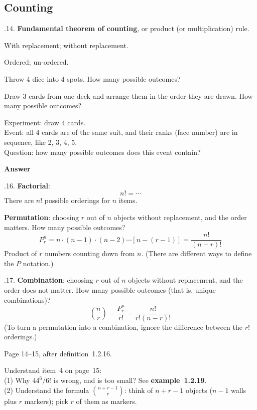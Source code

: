\documentclass[12pt]{article}
\begin{document}
\subsection{Counting}

.14. \textbf{Fundamental theorem of counting},
or product (or multiplication) rule.

With replacement; without replacement.

Ordered; un-ordered.

\example
Throw 4 dice into 4 spots.
How many possible outcomes?

\example
Draw 3 cards from one deck and arrange them in the order they are drawn.
How many possible outcomes?

\example
Experiment: draw 4 cards.\\
Event: all 4 cards are of the same suit, and their ranks (face
number) are in sequence, like 2, 3, 4, 5.\\
Question: how many possible outcomes does this event contain?

\textbf{Answer}


.16. \textbf{Factorial}:
\[
n! = \cdots
\]
There are $n!$ possible orderings for $n$ items.

 \textbf{Permutation}:
choosing $r$ out of $n$ objects without replacement,
and the order matters. How many possible outcomes?
\[
P^n_r = n \cdot (n-1) \cdot (n-2) \dotsb [n - (r-1)]
    = \frac{n!}{(n-r)!}
\]
Product of $r$ numbers counting down from $n$.
(There are different ways to define the $P$ notation.)

.17.
\textbf{Combination}:
choosing $r$ out of $n$ objects without replacement,
and the order does not matter.
How many possible outcomes (that is, unique combinations)?
\[
{n \choose r} = \frac{P^n_r}{r!} = \frac{n!}{r! (n-r)!}
\]
(To turn a permutation into a combination,
ignore the difference between the $r!$ orderings.)

\example Page 14--15, after definition~1.2.16.

Understand item~4 on page~15:\\
(1) Why $44^6/6!$ is wrong, and is too small?
See \textbf{example~1.2.19}.\\
(2) Understand the formula ${n + r - 1 \choose r}$:
think of $n+r-1$ objects ($n-1$ walls plus $r$ markers);
pick $r$ of them as markers.
\end{document}
